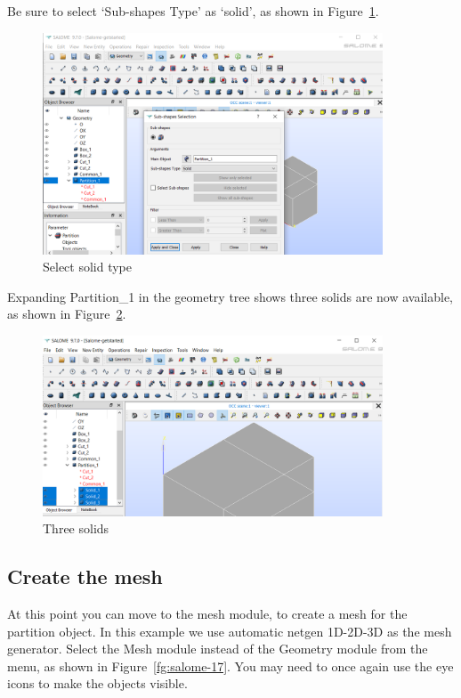 Be sure to select `Sub-shapes Type' as `solid', as shown in Figure~\ref{fg:salome-15}.

\begin{figure}[H]
\centering
\includegraphics[width=0.9\textwidth]{Salome-15}
\caption{Select solid type}\label{fg:salome-15}
\end{figure}

Expanding Partition\_1 in the geometry tree shows three solids are now available, as shown in Figure~\ref{fg:salome-16}.

\begin{figure}[H]
\centering
\includegraphics[width=0.9\textwidth]{Salome-16}
\caption{Three solids}\label{fg:salome-16}
\end{figure}

\subsection{Create the mesh}

At this point you can move to the mesh module, to create a mesh for the partition object.  In this example we use automatic netgen 1D-2D-3D as the mesh generator.  Select the Mesh module instead of the Geometry module from the menu, as shown in Figure~\ref{fg:salome-17}.  You may need to once again use the eye icons to make the objects visible.

